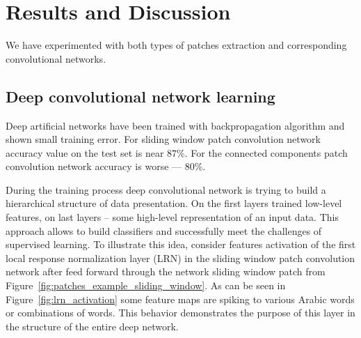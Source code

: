 \documentclass[conference,a4paper]{ieeetran}
\begin{document}

\section{Results and Discussion}
\label{sec:results_and_description}

We have experimented with both types of patches extraction and corresponding convolutional networks. 

\subsection{Deep convolutional network learning}


Deep artificial networks have been trained with backpropagation algorithm \cite{CNN} and shown small training error. For sliding window patch convolution network accuracy value on the test set is near $87 \%$. For the connected components patch convolution network accuracy is worse --- $80 \%$. 

During the training process deep convolutional network is trying to build a hierarchical structure of data presentation. On the first layers trained low-level features, on last layers -- some high-level representation of an input data. This approach allows to build classifiers and successfully meet the challenges of supervised learning. To illustrate this idea, consider features activation of the first local response normalization layer (LRN) in the sliding window patch convolution network after feed forward through the network sliding window patch from Figure~\ref{fig:patches_example_sliding_window}. As can be seen in Figure~\ref{fig:lrn_activation} some feature maps are spiking to various Arabic words or combinations of words. This behavior demonstrates the purpose of this layer in the structure of the entire deep network.
\end{document}
